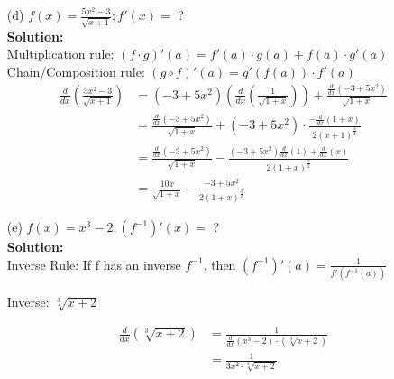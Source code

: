 \documentclass[a4paper]{article}
\begin{document}
\begin{enumerate}
\begin{enumerate}
		
		
		\item[(d)] $f(x) = \frac{5x^2 - 3}{\sqrt{x + 1}}; f'(x) = $ ?\\
		\textbf{Solution:}\\

Multiplication rule: $(f \cdot g)'(a) = f'(a) \cdot g(a) + f(a) \cdot g'(a)$\\
Chain/Composition rule: $(g \circ f)'(a) = g'(f(a)) \cdot f'(a)$\\

\begin{align*}
\frac{d}{dx}(\frac{5x^2 - 3}{\sqrt{x + 1}}) &= (-3 + 5x^2)(\frac{d}{dx}(\frac{1}{\sqrt{1+x}})) + \frac{\frac{d}{dx}(-3 + 5x^2)}{\sqrt{1+x}}\\
&= \frac{\frac{d}{dx}(-3 + 5x^2)}{\sqrt{1+x}} + (-3 + 5x^2) \cdot \frac{-\frac{d}{dx}(1+x)}{2(x+1)^{\frac{3}{2}}}\\
&= \frac{\frac{d}{dx}(-3 + 5x^2)}{\sqrt{1 + x}} - \frac{(-3 + 5x^2) \frac{d}{dx}(1) + \frac{d}{dx}(x)}{2(1 + x)^\frac{3}{2}}\\
&= \frac{10x}{\sqrt{1 + x}} - \frac{-3 + 5x^2}{2(1 + x)^\frac{3}{2}}
\end{align*}

		
		
		\item[(e)] $f(x) = x^3 - 2; ({f^{-1}})'(x) = $ ?\\
		\textbf{Solution:}\\
		
Inverse Rule: If f has an inverse $f^{-1}$, then $(f^{-1})'(a) = \frac{1}{f'(f^{-1}(a))}$		
		
Inverse: $\sqrt[3]{x + 2}$		
		
\begin{align*}
\frac{d}{dx}(\sqrt[3]{x + 2}) &= \frac{1}{\frac{d}{dx}(x^3 - 2) \cdot (\sqrt[3]{x + 2})}\\
&= \frac{1}{3x^2 \cdot \sqrt[3]{x + 2}}\\
\end{align*}

		
		
	\end{enumerate}
	
	
\end{enumerate}
\end{document}

